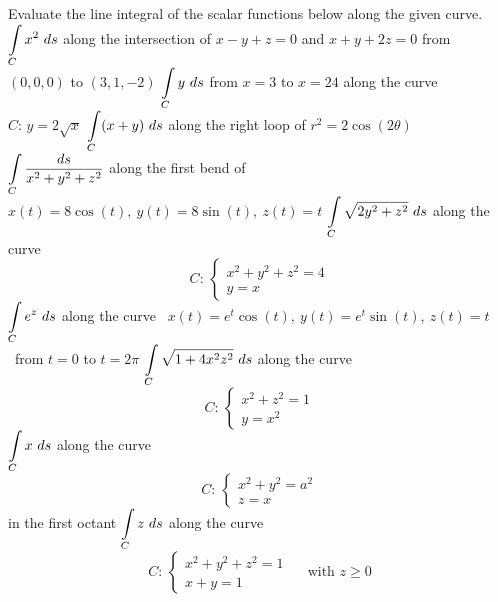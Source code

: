 \subsection*{}
\begin{Exercise}  Evaluate the line integral of the scalar functions below along the given curve.
	\Question[difficulty = 2] $\ds \int\limits_C x^2 \ ds$ \quad along the intersection of $x-y+z=0$ and $x+y+2z=0$ from $(0,0,0)$ to $(3,1,-2)$ 
	\Question[difficulty = 1] $\displaystyle \int\limits_C y \ ds$ \quad from $x=3$ to $x=24$ along the curve $C: \, y=2\sqrt{x}$
	\Question[difficulty = 2] $\displaystyle \int\limits_C (x+y) \ ds$ \quad along the right loop of $r^2 = 2 \cos (2 \theta)$
	\Question[difficulty = 2] $\displaystyle \int\limits_C \dfrac{ds}{x^2 + y^2 + z^2}$ \quad along the first bend of $x(t) = 8 \cos (t),\  y(t) = 8 \sin(t),\  z(t) = t$
	\Question[difficulty = 3] $\ds \int\limits_C \sqrt{2y^2 + z^2} \ ds$ \quad along the curve $$C: \,\left\{ \begin{array}{l}x^2+y^2+z^2 = 4 \\ y = x \end{array} \right.$$
	\Question[difficulty = 3] $\displaystyle \int\limits_C e^z \ ds$ \quad along the curve \  $x(t) = e^t \cos (t),\  y(t) = e^t \sin(t), \ z(t) = t$ \ from $t=0$ to $t=2\pi$
	\Question[difficulty = 3] $\ds \int\limits_C \sqrt{1+4x^2z^2} \ ds$ \quad along the curve $$C: \,\left\{ \begin{array}{l}x^2+z^2 = 1 \\ y = x^2 \end{array} \right.$$ %
	\Question[difficulty = 2] $\displaystyle \int\limits_C x \ ds$ \quad along the curve $$C: \,\left\{ \begin{array}{l}x^2+y^2 = a^2 \\ z=x \end{array} \right.$$ in the first octant  %
	\Question[difficulty = 2] $\ds \int\limits_C z \ ds$ \quad along the curve $$C: \,\left\{ \begin{array}{l}x^2+y^2 +z^2= 1 \\ x+y=1 \end{array} \right.\quad \text{ with } z \geq 0$$  %
\end{Exercise}

